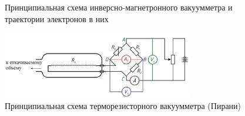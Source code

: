 \documentclass[12pt,a4paper]{article}
\begin{document}
\begin{figure}[h!]
\begin{center}
\begin{minipage}[h]{0.7\linewidth}
				\caption{Принципиальная схема инверсно-магнетронного вакуумметра и траектории электронов в них}
				\label{fig:Scem_of_vacuummetres}
			\end{minipage}
		\end{center}
		\begin{center}
			\begin{minipage}[lh]{0.7\linewidth}
				\includegraphics[width=1\linewidth]{Scem_of_vacuummetres_Pirani}
				\caption{Принципиальная схема терморезисторного вакуумметра (Пирани)} %
				\label{fig:Scem_of_vacuummetres_Pirani} %
			\end{minipage}
		\hfill	
		\end{center}
	\end{figure}
	
	\newpage
	
\end{document}
